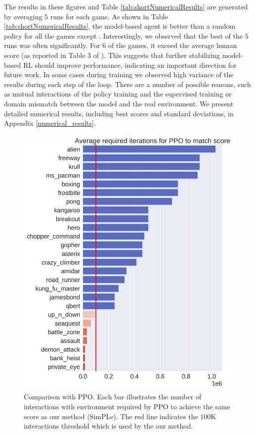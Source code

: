 The results in these figures and Table \ref{tab:shortNumericalResults} are generated by averaging $5$ runs for each game. As shown in Table \ref{tab:shortNumericalResults}, the model-based agent is better than a random policy for all the games except \bankh. Interestingly, we observed that the best of the $5$ runs was often significantly. For $6$ of the games, it exceed the average human score (as reported in Table 3 of \cite{Pohlenetal2018}). This suggests that further stabilizing model-based RL should improve performance, indicating an important direction for future work. In some cases during training  we observed high variance of the results during each step of the loop. There are a number of possible reasons, such as mutual interactions of the policy training and the supervised training or domain mismatch between the model and the real environment. We present detailed numerical results, including best scores and standard deviations, in Appendix \ref{numerical_results}.

\begin{figure}[t]
\centering
\includegraphics[width=1.0\columnwidth]{figures/ppo0228.png}
\caption{Comparison with PPO. Each bar illustrates the number of interactions with environment required by PPO to achieve the same score as our method (SimPLe). The red line indicates the $100$K interactions threshold which is used by the our method.}
\label{fig:compare_ppo}
\end{figure}


